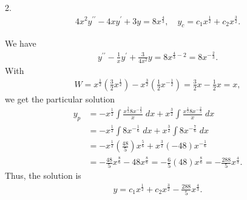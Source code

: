 \documentclass{report}
\begin{document}
    \bigbreak \noindent 
    \begin{mdframed}
        2. 
        \begin{align*}
            4x^{2}y^{\prime\prime} - 4xy^{\prime} + 3y = 8x^{\frac{4}{3}}, \quad y_{c} = c_{1}x^{\frac{1}{2}} + c_{2}x^{\frac{3}{2}}
        .\end{align*}
    \end{mdframed}
    \bigbreak \noindent 
    We have
    \begin{align*}
        y^{\prime\prime} - \frac{1}{x}y^{\prime} + \frac{3}{4x^{2}}y = 8x^{\frac{4}{3}-2} = 8x^{-\frac{2}{3}}
    .\end{align*}
    With 
    \begin{align*}
        W = x^{\frac{1}{2}}\left(\frac{3}{2}x^{\frac{1}{2}}\right) - x^{\frac{3}{2}}\left(\frac{1}{2}x^{-\frac{1}{2}}\right) = \frac{3}{2}x - \frac{1}{2}x = x
    ,\end{align*}
    we get the particular solution
    \begin{align*}
        y_{p} &= -x^{\frac{1}{2}}\int \frac{x^{\frac{3}{2}}8x^{-\frac{2}{3}}}{x}\; dx + x^{\frac{3}{2}}\int \frac{x^{\frac{1}{2}}8x^{-\frac{2}{3}}}{x}\; dx \\
        &= -x^{\frac{1}{2}}\int 8x^{-\frac{1}{6}}\;dx +x^{\frac{3}{2}}\int 8x^{-\frac{7}{6}}\;dx \\
        &= -x^{\frac{1}{2}}\left(\frac{48}{5}\right)x^{\frac{5}{6}} +x^{\frac{3}{2}}(-48)x^{-\frac{1}{6}} \\
        &=-\frac{48}{5}x^{\frac{8}{6}} - 48x^{\frac{8}{6}} = -\frac{6}{5}(48)x^{\frac{8}{6}} = -\frac{288}{5}x^{\frac{4}{3}}
    .\end{align*}
    Thus, the solution is
    \begin{align*}
        y = c_{1}x^{\frac{1}{2}} + c_{2}x^{\frac{3}{2}} -\frac{288}{5}x^{\frac{4}{3}}
    .\end{align*}
\end{document}
